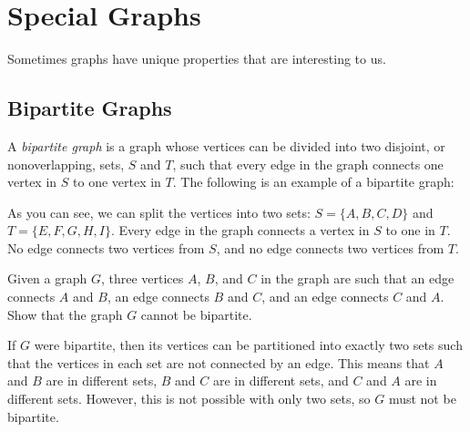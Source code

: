 \documentclass[11pt]{article}
\begin{document}
\section{Special Graphs}

Sometimes graphs have unique properties that are interesting to us.

\subsection{Bipartite Graphs}

\begin{definition}
\label{def:bipartite}
A \textit{bipartite graph} is a graph whose vertices can be divided into two disjoint, or nonoverlapping, sets, $S$ and $T$, such that every
edge in the graph connects one vertex in $S$ to one vertex in $T$. The following is an example of a bipartite graph:
\begin{center}
\end{center}
As you can see, we can split the vertices into two sets: $S=\{A,B,C,D\}$ and $T=\{E,F,G,H,I\}$. Every edge in the graph connects a vertex in $S$ to
one in $T$. No edge connects two vertices from $S$, and no edge connects two vertices from $T$.
\end{definition}

\begin{problem} %
Given a graph $G$, three vertices $A$, $B$, and $C$ in the graph are such that an edge connects $A$ and $B$, an edge connects $B$ and $C$, and an edge
connects $C$ and $A$. Show that the graph $G$ cannot be bipartite.
\end{problem}

\begin{solution}
If $G$ were bipartite, then its vertices can be partitioned into exactly two sets such that the vertices in each set are not connected by an edge.
This means that $A$ and $B$ are in different sets, $B$ and $C$ are in different sets, and $C$ and $A$ are in different sets. However, this is not possible
with only two sets, so $G$ must not be bipartite.
\end{solution}
\end{document}
